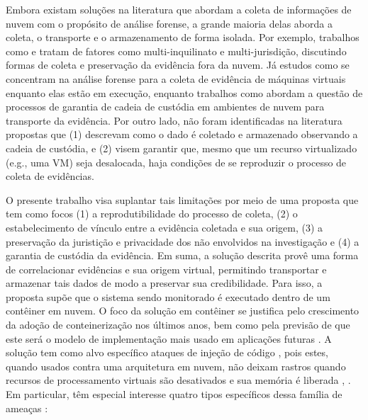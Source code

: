 \documentclass[conference]{IEEEtran}
\newcommand{\marcosT}[1]{{\color{red}{TODO: #1}}}
\begin{document}
%
Embora existam soluções na literatura que abordam a coleta de informações de nuvem com o propósito de análise forense, a grande maioria delas aborda a coleta, o transporte e o armazenamento de forma isolada.
%
Por exemplo, trabalhos como \cite{Dykstra_FROST:2013} e \cite{Reichert_Auto_acquisition:2015} tratam de fatores como multi-inquilinato e multi-jurisdição, discutindo formas de coleta e preservação da evidência fora da nuvem.
%
Já estudos como \cite{George_DF2CE:2012} se concentram na análise forense para a coleta de evidência de máquinas virtuais enquanto elas estão em execução, enquanto trabalhos como \cite{Sang_Log_approach:2013} abordam a questão de processos de garantia de cadeia de custódia em ambientes de nuvem para transporte da evidência.
%
%
%
Por outro lado, não foram identificadas na literatura propostas que (1) descrevam como o dado é coletado e armazenado observando a cadeia de custódia, e (2) visem garantir que, mesmo que um recurso virtualizado (e.g., uma VM) seja desalocada, haja condições de se reproduzir o processo de coleta de evidências.



%
O presente trabalho visa suplantar tais limitações por meio de uma proposta que tem como focos (1) a reprodutibilidade do processo de coleta, (2) o estabelecimento de vínculo entre a evidência coletada e sua origem, (3) a preservação da juristição e privacidade dos não envolvidos na investigação e (4) a garantia de custódia da evidência.
Em suma, a solução descrita provê uma forma de correlacionar evidências e sua origem virtual, permitindo transportar e armazenar tais dados de modo a preservar sua credibilidade.
%
Para isso, a proposta supõe que o sistema sendo monitorado é executado dentro de um contêiner em nuvem. 
%
O foco da solução em contêiner se justifica pelo crescimento da adoção de conteinerização nos últimos anos, bem como pela previsão de que este será o modelo de implementação mais usado em aplicações futuras \cite{Piraghaj_Container_Cloud_Computing:2016}.
%
A solução tem como alvo específico ataques de injeção de código \cite{Case_Memory_Forensics:2014}, pois estes, quando usados contra uma arquitetura em nuvem, não deixam rastros quando recursos de processamento virtuais são desativados e sua memória é liberada \cite{Vomel_Memory_Acquisition:2013}, \cite{Case_Memory_Forensics:2014}.
%
Em particular, têm especial interesse quatro tipos específicos dessa família de ameaças \cite{Case_Memory_Forensics:2014}:
\end{document}
